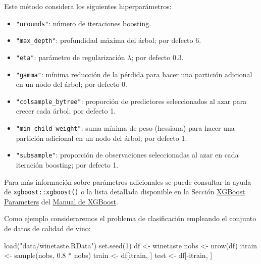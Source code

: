 \documentclass[
]{book}
\newenvironment{Shaded}{\begin{snugshade}}{\end{snugshade}}
\newcommand{\DecValTok}[1]{\textcolor[rgb]{0.00,0.00,0.81}{#1}}
\newcommand{\FloatTok}[1]{\textcolor[rgb]{0.00,0.00,0.81}{#1}}
\newcommand{\FunctionTok}[1]{\textcolor[rgb]{0.00,0.00,0.00}{#1}}
\newcommand{\NormalTok}[1]{#1}
\newcommand{\OtherTok}[1]{\textcolor[rgb]{0.56,0.35,0.01}{#1}}
\newcommand{\SpecialCharTok}[1]{\textcolor[rgb]{0.00,0.00,0.00}{#1}}
\newcommand{\StringTok}[1]{\textcolor[rgb]{0.31,0.60,0.02}{#1}}
\theoremstyle{break}
\theoremstyle{definition}
\theoremstyle{definition}
\theoremstyle{definition}
\theoremstyle{definition}
\theoremstyle{remark}
\begin{document}
Este método considera los siguientes hiperparámetros:

\begin{itemize}
\item
  \texttt{"nrounds"}: número de iteraciones boosting.
\item
  \texttt{"max\_depth"}: profundidad máxima del árbol; por defecto 6.
\item
  \texttt{"eta"}: parámetro de regularización \(\lambda\); por defecto 0.3.
\item
  \texttt{"gamma"}: mínima reducción de la pérdida para hacer una partición adicional en un nodo del árbol; por defecto 0.
\item
  \texttt{"colsample\_bytree"}: proporción de predictores seleccionados al azar para crecer cada árbol; por defecto 1.
\item
  \texttt{"min\_child\_weight"}: suma mínima de peso (hessiana) para hacer una partición adicional en un nodo del árbol; por defecto 1.
\item
  \texttt{"subsample"}: proporción de observaciones seleccionadas al azar en cada iteración boosting; por defecto 1.
\end{itemize}

Para más información sobre parámetros adicionales se puede consultar la ayuda de \texttt{xgboost::xgboost()} o la lista detallada disponible en la Sección \href{https://xgboost.readthedocs.io/en/latest/parameter.html}{XGBoost Parameters} del \href{https://xgboost.readthedocs.io}{Manual de XGBoost}.

Como ejemplo consideraremos el problema de clasificación empleando el conjunto de datos de calidad de vino:

\begin{Shaded}
\begin{Highlighting}[]
\FunctionTok{load}\NormalTok{(}\StringTok{"data/winetaste.RData"}\NormalTok{)}
\FunctionTok{set.seed}\NormalTok{(}\DecValTok{1}\NormalTok{)}
\NormalTok{df }\OtherTok{\textless{}{-}}\NormalTok{ winetaste}
\NormalTok{nobs }\OtherTok{\textless{}{-}} \FunctionTok{nrow}\NormalTok{(df)}
\NormalTok{itrain }\OtherTok{\textless{}{-}} \FunctionTok{sample}\NormalTok{(nobs, }\FloatTok{0.8} \SpecialCharTok{*}\NormalTok{ nobs)}
\NormalTok{train }\OtherTok{\textless{}{-}}\NormalTok{ df[itrain, ]}
\NormalTok{test }\OtherTok{\textless{}{-}}\NormalTok{ df[}\SpecialCharTok{{-}}\NormalTok{itrain, ]}
\end{Highlighting}
\end{Shaded}
\end{document}
